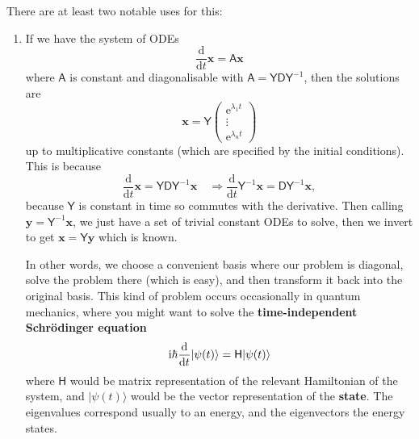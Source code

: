 \documentclass[letter-paper]{tufte-book}
\newenvironment{example}[1][Example]{\begin{trivlist}
\item[\hskip \labelsep {\bfseries #1}]}{\end{trivlist}}
\newcommand{\ex}{\mathrm{e}}
\newcommand{\zi}{{\rm i}}
\begin{document}
There are at least two notable uses for this:
\begin{example}
  \begin{enumerate}
    \item If we have the system of ODEs
    \begin{equation*}
      \frac{\mathrm{d}}{\mathrm{d}t}\boldsymbol{x} = \mathsf{A}\boldsymbol{x}
    \end{equation*}
    where $\mathsf{A}$ is constant and diagonalisable with $\mathsf{A} =
    \mathsf{YD}\mathsf{Y}^{-1}$, then the solutions are
    \begin{equation*}
      \boldsymbol{x} = \mathsf{Y}\begin{pmatrix}\ex^{\lambda_1 t} \\ \vdots \\ \ex^{\lambda_n t}\end{pmatrix}
    \end{equation*}
    up to multiplicative constants (which are specified by the initial
    conditions). This is because
    \begin{equation*}
      \frac{\mathrm{d}}{\mathrm{d}t}\boldsymbol{x} = \mathsf{YD}\mathsf{Y}^{-1}\boldsymbol{x} \quad \Rightarrow \frac{\mathrm{d}}{\mathrm{d}t} \mathsf{Y}^{-1}\boldsymbol{x} = \mathsf{D}\mathsf{Y}^{-1}\boldsymbol{x},
    \end{equation*}
    because $\mathsf{Y}$ is constant in time so commutes with the derivative.
    Then calling $\boldsymbol{y} = \mathsf{Y}^{-1}\boldsymbol{x}$, we just have
    a set of trivial constant ODEs to solve, then we invert to get
    $\boldsymbol{x} = \mathsf{Y}\boldsymbol{y}$ which is known. 
    
    In other words, we choose a convenient basis where our problem is diagonal,
    solve the problem there (which is easy), and then transform it back into the
    original basis. This kind of problem occurs occasionally in quantum
    mechanics, where you might want to solve the \textbf{time-independent
    Schr\"odinger equation}
    \begin{equation*}
      \zi\hbar\frac{\mathrm{d}}{\mathrm{d}t}|\psi(t)\rangle = \mathsf{H}|\psi(t)\rangle
    \end{equation*}
    where $\mathsf{H}$ would be matrix representation of the relevant
    Hamiltonian of the system, and
    $|\psi(t)\rangle$ would be the vector representation of the \textbf{state}.
    The eigenvalues correspond usually to an energy, and the eigenvectors the
    energy states.
    

\end{enumerate}
\end{example}
\end{document}
